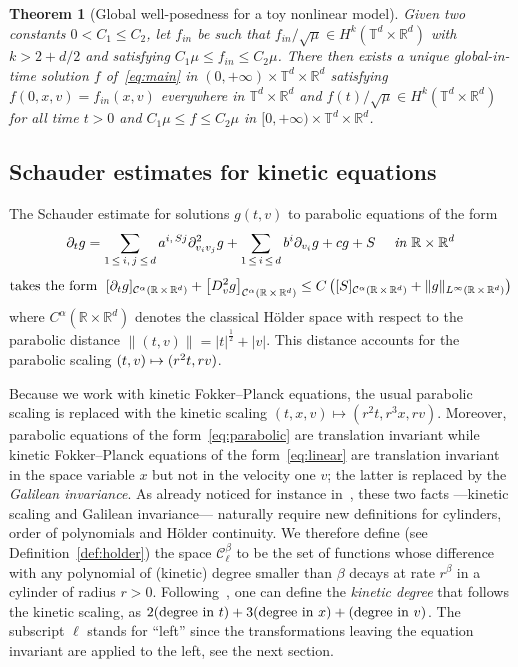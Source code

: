 \documentclass[10pt]{amsart}
\newtheorem{theo}{Theorem}[section]
\theoremstyle{definition}\newtheorem{defi}[theo]{Definition}\newtheorem{rema}[theo]{Remark}\newtheorem{exam}[theo]{Example}\newtheorem{exem}[theo]{Example}\newtheorem{nota}[theo]{Notation}
\newcommand{\R}{\mathbb{R}}
\newcommand{\T}{\mathbb{T}}
\newcommand{\cC}{\mathcal{C}}
\begin{document}
\begin{theo}[Global well-posedness for a toy nonlinear
model]\label{theo:main-holder}
Given two constants $0<C_1\le C_2$, let $f_{in}$ be such that $f_{in}/\sqrt{\mu} \in H^k(\T^d \times \R^{d})$ with $k > 2+d/2$ and satisfying $ C_1 \mu \le f_{in} \le C_2 \mu$. There then exists a unique global-in-time solution $f$ of~\eqref{eq:main} in $(0,+\infty) \times \T^d \times \R^d$ satisfying $f(0,x,v) = f_{in} (x,v)$ everywhere in $\T^d \times \R^{d}$ and $f(t)/\sqrt{\mu} \in H^k(\T^d \times \R^{d})$ for all time $t>0$ and $C_1 \mu \le f \le C_2 \mu$ in $[0,+\infty) \times \T^d \times \R^d$.
\end{theo}



\subsection{Schauder estimates for kinetic equations}

The Schauder estimate for solutions $g(t,v)$ to parabolic equations of the form
\begin{multline}\label{eq:parabolic}
\partial_t g =
\sum_{1\,\le\:i,\,j\:\le\,d} a^{i,\,Sj} \partial^2_{v_iv_j} g +
\sum_{1\,\le\,i\,\le\,d}b^i \partial_{v_i} g + c g + S \quad \emph{ in } \R \times \R^d \\[1ex]
\text{takes the form } \; [\partial_t g]_{\cC^{\alpha}\left(\R\,\times\,\R^d\right)} + \left[D^2_v g\right]_{\cC^\alpha\left(\R\,\times\,\R^d\right)} \le C
\left([S]_{\cC^\alpha\left(\R\,\times\,\R^d\right)} + \|g\|_{L^\infty\left(\R\,\times\,\R^d\right)} \right)
\end{multline}
where $C^\alpha (\R \times \R^d)$ denotes the classical H\"older space with respect to the parabolic distance $\|(t,v)\|=|t|^{\frac12} + |v|$. This distance accounts for the parabolic scaling $(t,v)\linebreak\mapsto (r^2t,rv)$.

Because we work with kinetic Fokker--Planck equations, the usual parabolic scaling is replaced with the kinetic scaling $(t,x,v) \mapsto (r^2t,r^3x,rv)$. Moreover, parabolic equations of the form~\eqref{eq:parabolic} are translation invariant while kinetic Fokker--Planck equations of the form~\eqref{eq:linear} are translation invariant in the space variable $x$ but not in the velocity one $v$; the latter is replaced by the \emph{Galilean invariance}. As already noticed for instance in~\cite{gimv,polidoro1994}, these two facts ---kinetic scaling and Galilean invariance--- naturally require new definitions for cylinders, order of polynomials and H\"older continuity. We therefore define (see Definition~\ref{def:holder}) the space $\cC^\beta_\ell$ to be the set of functions whose difference with any polynomial of (kinetic) degree smaller than $\beta$ decays at rate $r^\beta$ in a cylinder of radius $r>0$. Following~\cite{imbert2018schauder}, one can define the \emph{kinetic degree} that follows the kinetic scaling, as $2 (\text{degree in } t) + 3(\text{degree in } x)\linebreak+ (\text{degree in } v)$. The subscript $\ell$ stands for ``left'' since the transformations leaving the equation invariant are applied to the left, see the next section.
\end{document}
